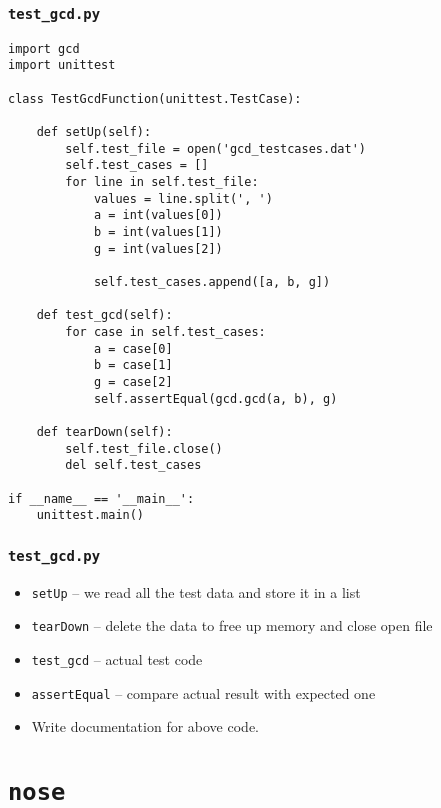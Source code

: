 \documentclass[12pt,presentation]{beamer}
\begin{document}
\begin{frame}
  \frametitle{\texttt{test\_gcd.py}}
\small
\begin{lstlisting}
import gcd
import unittest

class TestGcdFunction(unittest.TestCase):

    def setUp(self):
        self.test_file = open('gcd_testcases.dat')
        self.test_cases = []
        for line in self.test_file:
            values = line.split(', ')
            a = int(values[0])
            b = int(values[1])
            g = int(values[2])

            self.test_cases.append([a, b, g])

    def test_gcd(self):
        for case in self.test_cases:
            a = case[0]
            b = case[1]
            g = case[2]
            self.assertEqual(gcd.gcd(a, b), g)

    def tearDown(self):
        self.test_file.close()
        del self.test_cases

if __name__ == '__main__':
    unittest.main()
\end{lstlisting}
\end{frame}

\begin{frame}[fragile]
  \frametitle{\texttt{test\_gcd.py}}
  \begin{itemize}
  \item \texttt{setUp} -- we read all the test data and store it in a
    list
  \item \texttt{tearDown} -- delete the data to free up memory and
    close open file
  \item \texttt{test\_gcd} -- actual test code
  \item \texttt{assertEqual} -- compare actual result with expected one
  \item Write documentation for above code. 
  \end{itemize}
\end{frame}

\section{\texttt{nose}}
\end{document}
